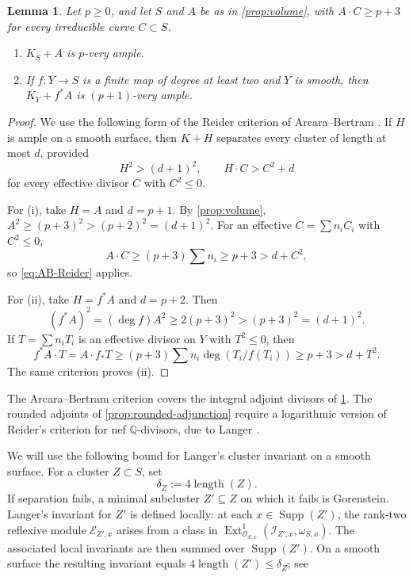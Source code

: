 \documentclass[11pt,reqno]{amsart}
\numberwithin{equation}{section}
\newtheorem{lemma}[lemma]{Lemma}
\theoremstyle{remark}
\newcommand{\sshf}[1]{\mathcal{O}_{#1}}
\newcommand{\is}[1]{\mathscr I_{#1}}
\begin{document}
\begin{lemma}\label{lem:adjoint-separation}
Let \(p\geq0\), and let \(S\) and \(A\) be as in
\cref{prop:volume}, with \(A\cdot C\geq p+3\) for every irreducible
curve \(C\subset S\).
\begin{enumerate}
\item \(K_S+A\) is \(p\)-very ample.
\item If \(f\colon Y\to S\) is a finite map of degree at least two and \(Y\) is
smooth, then \(K_Y+f^*A\) is \((p+1)\)-very ample.
\end{enumerate}
\end{lemma}

\begin{proof}
We use the following form of the Reider criterion of Arcara--Bertram
\cite[Application 2.2 and the ensuing Reider theorem]{ArcaraBertram}.
If \(H\) is ample on a smooth surface, then \(K+H\) separates every
cluster of length at most \(d\), provided
\begin{equation}\label{eq:AB-Reider}
 H^2>(d+1)^2,\qquad
 H\cdot C>C^2+d
\end{equation}
for every effective divisor \(C\) with \(C^2\leq0\).

For (i), take \(H=A\) and \(d=p+1\). By
\cref{prop:volume}, \(A^2\geq (p+3)^2>(p+2)^2=(d+1)^2\).
For an effective \(C=\sum n_iC_i\) with \(C^2\leq0\),
\[
 A\cdot C\geq (p+3)\sum n_i\geq p+3>d+C^2,
\]
so \eqref{eq:AB-Reider} applies.

For (ii), take \(H=f^*A\) and \(d=p+2\). Then
\[
  (f^*A)^2=(\deg f)A^2\geq2(p+3)^2>(p+3)^2=(d+1)^2.
\]
If \(T=\sum n_iT_i\) is an effective divisor on \(Y\) with \(T^2\leq0\),
then
\[
 f^*A\cdot T=A\cdot f_*T\geq (p+3)\sum n_i\deg(T_i/f(T_i))
 \geq p+3>d+T^2.
\]
The same criterion proves (ii).
\end{proof}

The Arcara--Bertram criterion covers the integral adjoint divisors of \cref{lem:adjoint-separation}. The rounded adjoints of
\cref{prop:rounded-adjunction} require a logarithmic
version of Reider's criterion for nef \(\mathbb{Q}\)-divisors, due to Langer \cite{Langer}.

We will use the following bound for
Langer's cluster
invariant on a smooth surface. For a cluster \(Z\subset S\), set
\begin{equation}\label{eq:Langer-cluster-bound}
 \delta_Z:=4\operatorname{length}(Z).
\end{equation}
If separation fails, a minimal
subcluster \(Z'\subseteq Z\) on which it fails is Gorenstein.
Langer's invariant for \(Z'\) is defined locally: at each \(x\in\operatorname{Supp}(Z')\), the rank-two reflexive module
\(\mathcal E_{Z',x}\) arises from a class in
\(
\operatorname{Ext}^1_{\sshf{S,x}}
       (\is{Z',x},\omega_{S,x}).
\)
The associated local invariants are then summed over \(\operatorname{Supp}(Z')\).
On a smooth surface the resulting invariant equals
\(4\operatorname{length}(Z')\leq\delta_Z\); see
\cite[(0.3.2) and Definitions 1.1.1--1.1.2]{Langer}
\end{document}

